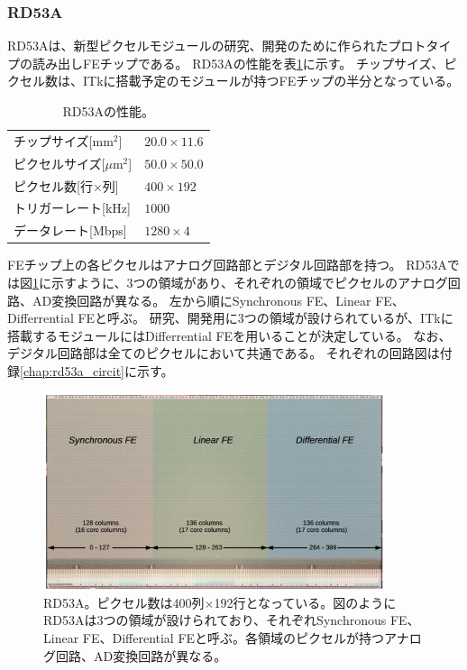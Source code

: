 \subsubsection{RD53A}
RD53A\cite{2-1}は、新型ピクセルモジュールの研究、開発のために作られたプロトタイプの読み出しFEチップである。
RD53Aの性能を表\ref{rd53a_spec}に示す。
チップサイズ、ピクセル数は、ITkに搭載予定のモジュールが持つFEチップの半分となっている。

\begin{table}[tbp]
\begin{center}
\caption[RD53Aの性能]{RD53Aの性能。}
\label{rd53a_spec}
  \begin{tabular}{|ll|} \hline
    チップサイズ[mm$^2$] & $20.0\times 11.6$ \\ 
    ピクセルサイズ[$\mu$m$^2$] & $50.0\times 50.0$ \\ 
    ピクセル数[行$\times$列] & $400\times 192$ \\ 
    トリガーレート[kHz] & $1000$ \\ 
    データレート[Mbps] & $1280\times4$ \\ \hline
  \end{tabular}
\end{center}
\end{table}

FEチップ上の各ピクセルはアナログ回路部とデジタル回路部を持つ。
RD53Aでは図\ref{fechip_rd53a}に示すように、3つの領域があり、それぞれの領域でピクセルのアナログ回路、AD変換回路が異なる。
左から順にSynchronous FE、Linear FE、Differrential FEと呼ぶ。
研究、開発用に3つの領域が設けられているが、ITkに搭載するモジュールにはDifferrential FEを用いることが決定している。
なお、デジタル回路部は全てのピクセルにおいて共通である。
それぞれの回路図は付録\ref{chap:rd53a_circit}に示す。

\begin{figure}[bpt]\centering
\includegraphics[width=10cm]{fechip_rd53a}
\caption[RD53A]{RD53A\cite{2-1}。ピクセル数は400列$\times$192行となっている。図のようにRD53Aは3つの領域が設けられており、それぞれSynchronous FE、Linear FE、Differential FEと呼ぶ。各領域のピクセルが持つアナログ回路、AD変換回路が異なる。}
\label{fechip_rd53a}
\end{figure}

